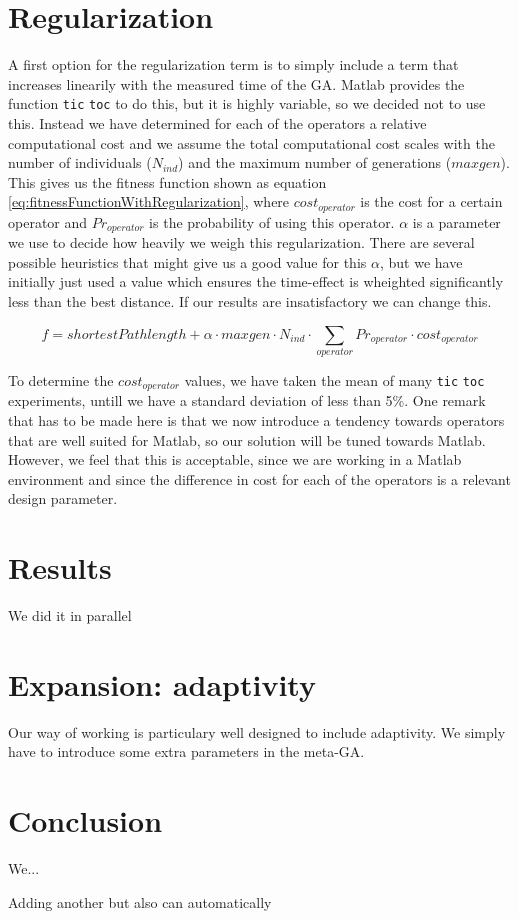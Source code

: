\documentclass[a4paper]{article}
\begin{document}
\section{Regularization}

A first option for the regularization term is to simply include a term that increases linearily with the measured time of the GA. Matlab provides the function \texttt{tic} \texttt{toc} to do this, but it is highly variable, so we decided not to use this. Instead we have determined for each of the operators a relative computational cost and we assume the total computational cost scales with the number of individuals ($N_{ind}$) and the maximum number of generations ($maxgen$). This gives us the fitness function shown as equation \ref{eq:fitnessFunctionWithRegularization}, where $cost_{operator}$ is the cost for a certain operator and $Pr_{operator}$ is the probability of using this operator. $\alpha$ is a parameter we use to decide how heavily we weigh this regularization. There are several possible heuristics that might give us a good value for this $\alpha$, but we have initially just used a value which ensures the time-effect is wheighted significantly less than the best distance. If our results are insatisfactory we can change this.

\begin{equation}
	f=shortestPathlength + \alpha\cdot maxgen\cdot N_{ind}\cdot \sum_{operator}Pr_{operator}\cdot cost_{operator}
\label{eq:fitnessFunctionWithRegularization}
\end{equation}

To determine the $cost_{operator}$ values, we have taken the mean of many \texttt{tic} \texttt{toc} experiments, untill we have a standard deviation of less than 5\%. One remark that has to be made here is that we now introduce a tendency towards operators that are well suited for Matlab, so our solution will be tuned towards Matlab. However, we feel that this is acceptable, since we are working in a Matlab environment and since the difference in cost for each of the operators is a relevant design parameter.

\section{Results}

We did it in parallel

\section{Expansion: adaptivity}

Our way of working is particulary well designed to include adaptivity. We simply have to introduce some extra parameters in the meta-GA.

\section{Conclusion}

We...

Adding another 
but also can automatically
\end{document}
